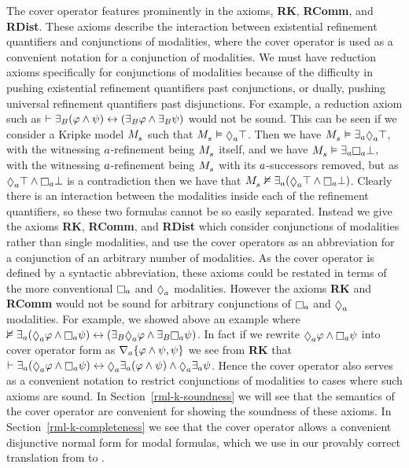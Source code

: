 The cover operator features prominently in the axioms, {\bf RK}, {\bf RComm}, and {\bf RDist}.
These axioms describe the interaction between existential refinement quantifiers and conjunctions of modalities, where the cover operator is used as a convenient notation for a conjunction of modalities.
We must have reduction axioms specifically for conjunctions of modalities because of the difficulty in pushing existential refinement quantifiers past conjunctions, or dually, pushing universal refinement quantifiers past disjunctions.
For example, a reduction axiom such as $\vdash {\exists_{B}} (\varphi \land \psi) \leftrightarrow ({\exists_{B}} \varphi \land {\exists_{B}} \psi)$ would not be sound.
This can be seen if we consider a Kripke model $\kPModel{\kStateS}$ such that $\kPModel{\kStateS} \entails \possibleA \top$.
Then we have $\kPModel{\kStateS} \entails \somerefsA \possibleA \top$, with the witnessing $a$-refinement being $\kPModel{\kStateS}$ itself, and we have $\kPModel{\kStateS} \entails \somerefsA \necessaryA \bot$, with the witnessing $a$-refinement being $\kPModel{\kStateS}$ with its $a$-successors removed, but as $\possibleA \top \land \necessaryA \bot$ is a contradiction then we have that $\kPModel{\kStateS} \nentails \somerefsA (\possibleA \top \land \necessaryA \bot)$.
Clearly there is an interaction between the modalities inside each of the refinement quantifiers, so these two formulas cannot be so easily separated.
Instead we give the axioms {\bf RK}, {\bf RComm}, and {\bf RDist} which consider conjunctions of modalities rather than single modalities, and use the cover operators as an abbreviation for a conjunction of an arbitrary number of modalities.
As the cover operator is defined by a syntactic abbreviation, these axioms could be restated in terms of the more conventional $\necessaryA$ and $\possibleA$ modalities.
However the axioms {\bf RK} and {\bf RComm} would not be sound for arbitrary conjunctions of $\necessaryA$ and $\possibleA$ modalities.
For example, we showed above an example where $\nentails \somerefsA (\possibleA \phi \land \necessaryA \psi) \iff (\somerefsBs \possibleA \phi \land \somerefsBs \necessaryA \psi)$.
In fact if we rewrite $\possibleA \phi \land \necessaryA \psi$ into cover operator form as $\nabla_{a} \{\varphi \land \psi, \psi\}$ we see from {\bf RK} that $\proves \somerefsA (\possibleA \phi \land \necessaryA \psi) \iff \possibleA \somerefsA (\phi \land \psi) \land \possibleA \somerefsA \psi$.
Hence the cover operator also serves as a convenient notation to restrict conjunctions of modalities to cases where such axioms are sound.
In Section~\ref{rml-k-soundness} we will see that the semantics of the cover operator are convenient for showing the soundness of these axioms.
In Section~\ref{rml-k-completeness} we see that the cover operator allows a convenient disjunctive normal form for modal formulas, which we use in our provably correct translation from \langRml{} to \langMl{}.

